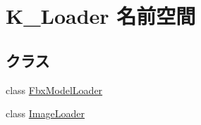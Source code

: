 \hypertarget{namespace_k___loader}{}\section{K\+\_\+\+Loader 名前空間}
\label{namespace_k___loader}
\subsection*{クラス}
\begin{DoxyCompactItemize}
\item 
class \mbox{\hyperlink{class_k___loader_1_1_fbx_model_loader}{Fbx\+Model\+Loader}}
\item 
class \mbox{\hyperlink{class_k___loader_1_1_image_loader}{Image\+Loader}}
\end{DoxyCompactItemize}
